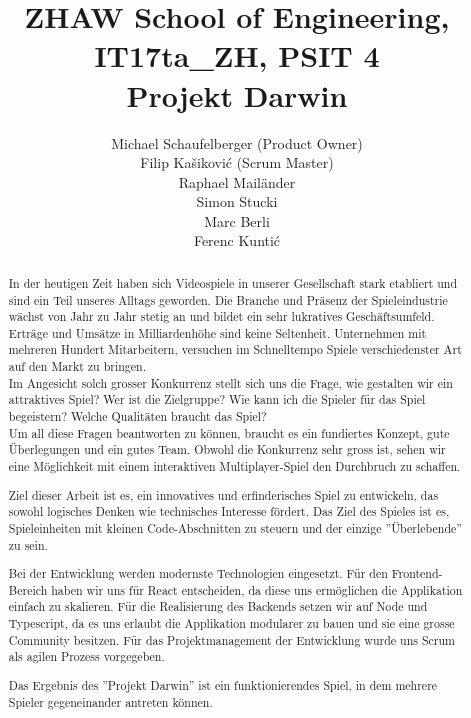 \documentclass[11pt,a4paper,titlepage]{article}
\author{
Michael Schaufelberger (Product Owner)\\
Filip Kašiković (Scrum Master)\\
Raphael Mailänder\\
Simon Stucki\\
Marc Berli\\
Ferenc Kuntić}
\title{{\small ZHAW School of Engineering, 
IT17ta\_ZH, 
PSIT 4}\\
Projekt Darwin}
\begin{document}
\maketitle

\begin{otherlanguage}{english}
\begin{abstract}

In der heutigen Zeit haben sich Videospiele in unserer Gesellschaft stark etabliert und sind ein Teil unseres Alltags geworden. Die Branche und Präsenz der Spieleindustrie wächst von Jahr zu Jahr stetig an und bildet ein sehr lukratives Geschäftsumfeld. Erträge und Umsätze in Milliardenhöhe sind keine Seltenheit. Unternehmen mit mehreren Hundert Mitarbeitern, versuchen im Schnelltempo Spiele verschiedenster Art auf den Markt zu bringen. 
\\Im Angesicht solch grosser Konkurrenz stellt sich uns die Frage, wie gestalten wir ein attraktives Spiel? Wer ist die Zielgruppe? Wie kann ich die Spieler für das Spiel begeistern? Welche Qualitäten braucht das Spiel?
\\Um all diese Fragen beantworten zu können, braucht es ein fundiertes Konzept, gute Überlegungen und ein gutes Team. Obwohl die Konkurrenz sehr gross ist, sehen wir eine Möglichkeit mit einem interaktiven Multiplayer-Spiel den Durchbruch zu schaffen.

Ziel dieser Arbeit ist es, ein innovatives und erfinderisches Spiel zu entwickeln, das sowohl logisches Denken wie technisches Interesse fördert. Das Ziel des Spieles ist es, Spieleinheiten mit kleinen Code-Abschnitten zu steuern und der einzige ''Überlebende'' zu sein.

Bei der Entwicklung werden modernste Technologien eingesetzt. Für den Frontend-Bereich haben wir uns für React entscheiden, da diese uns ermöglichen die Applikation einfach zu skalieren. Für die Realisierung des Backends setzen wir auf Node und Typescript, da es uns erlaubt die Applikation modularer zu bauen und sie eine grosse Community besitzen.
Für das Projektmanagement der Entwicklung wurde uns Scrum als agilen Prozess vorgegeben.

Das Ergebnis des ''Projekt Darwin'' ist ein funktionierendes Spiel, in dem mehrere Spieler gegeneinander antreten können.

\end{abstract}
\end{otherlanguage}
\end{document}
